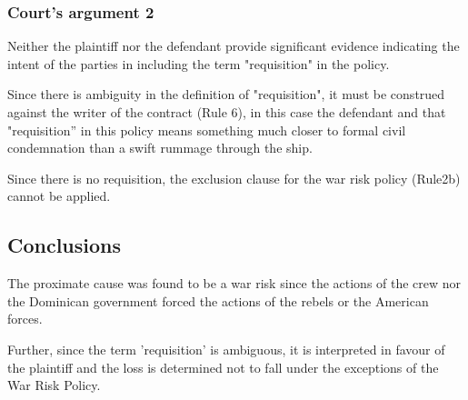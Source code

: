 \subsubsection{Court's argument 2}

Neither the plaintiff nor the defendant provide significant evidence  indicating the intent of the parties in including the term "requisition" in the policy. 

Since there is ambiguity in the definition of "requisition", it must be construed against the writer of the contract (Rule 6), in this case the defendant and that "requisition” in this policy means something much closer to formal civil condemnation than a swift rummage through the ship.

Since there is no requisition, the exclusion clause for the war risk policy (Rule2b) cannot be applied. 

\subsection{Conclusions}

The proximate cause was found to be a war risk since the actions of the crew nor the Dominican government forced the actions of the rebels or the American forces.

Further, since the term 'requisition' is ambiguous, it is interpreted in favour of the plaintiff and the loss is determined not to fall under the exceptions of the War Risk Policy. 

\FloatBarrier
